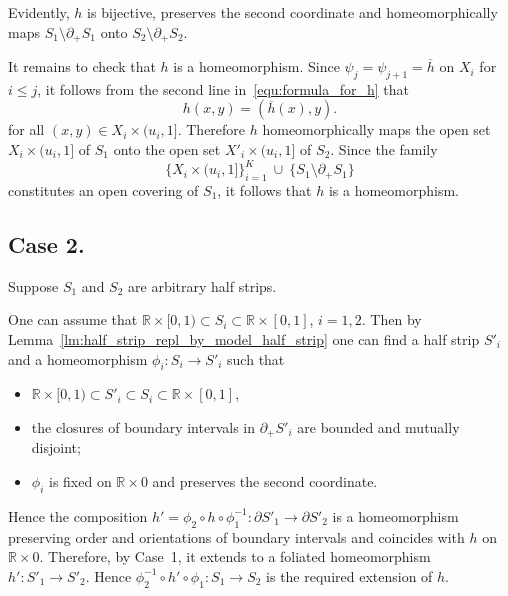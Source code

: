 \documentclass[12pt, reqno]{amsart}
\newcommand{\bR}{\mathbb{R}}
\newcommand\dif{h}
\newcommand{\strip}{S}
\newcommand{\bdX}{X}
\newcommand{\leveld}[1]{u_{#1}}
\begin{document}
Evidently, $\dif$ is bijective, preserves the second coordinate and homeomorphically maps $\strip_{1} \setminus \partial_{+} \strip_{1}$ onto $\strip_{2} \setminus \partial_{+} \strip_{2}$.

It remains to check that $\dif$ is a homeomorphism.
Since $\psi_j = \psi_{j+1} = \overline{h}$ on $\bdX_i$ for $i\leq j$, it follows from the second line in~\eqref{equ:formula_for_h} that
\[
\dif(x,y)=(\overline{\dif}(x),y).
\]
for all $(x,y) \in \bdX_i \times (\leveld{i}, 1]$.
Therefore $\dif$ homeomorphically maps the open set $\bdX_i \times (\leveld{i}, 1]$ of $\strip_1$ onto the open set $\bdX'_i \times (\leveld{i}, 1]$ of $\strip_2$.
Since the family 
\[
\{ \bdX_i \times (\leveld{i}, 1] \}_{i=1}^{K} \ \cup \ \{  \strip_{1} \setminus \partial_{+} \strip_{1} \}
\]
constitutes an open covering of $\strip_1$, it follows that $\dif$ is a homeomorphism.




\subsection*{Case 2.}
Suppose $\strip_1$ and $\strip_2$ are arbitrary half strips.

One can assume that $\bR\times[0,1) \subset \strip_i \subset \bR\times[0,1]$, $i=1,2$.
Then by Lemma~\ref{lm:half_strip_repl_by_model_half_strip} one can find a half strip $\strip'_i$ and a homeomorphism $\phi_i:\strip_i \to \strip'_i$ such that  
\begin{itemize}
\item 
$\bR\times[0,1) \subset \strip'_i \subset \strip_i \subset \bR\times[0,1]$,
\item 
the closures of boundary intervals in $\partial_{+}\strip'_i$ are bounded and mutually disjoint;
\item 
$\phi_i$ is fixed on $\bR\times 0$ and preserves the second coordinate.
\end{itemize}
Hence the composition $\dif' = \phi_2 \circ \dif \circ \phi_1^{-1}: \partial\strip'_1 \to \partial\strip'_2$ is a homeomorphism preserving order and orientations of boundary intervals and coincides with $\dif$ on $\bR\times 0$.
Therefore, by Case~1, it extends to a foliated homeomorphism $\dif':\strip'_1 \to \strip'_2$.
Hence $\phi_2^{-1} \circ \dif' \circ \phi_1:\strip_1 \to \strip_2$ is the required extension of $\dif$.
\end{document}
